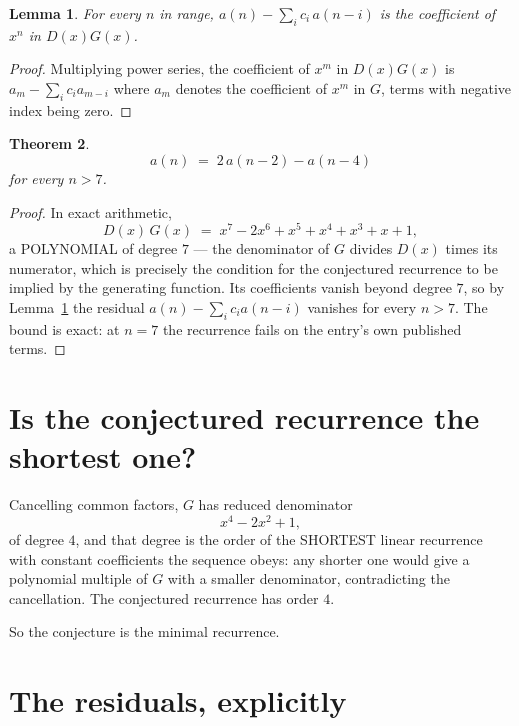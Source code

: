 \documentclass[11pt,a4paper]{article}
\theoremstyle{plain}
\newtheorem{theorem}{Theorem}
\newtheorem{lemma}[theorem]{Lemma}
\theoremstyle{definition}
\begin{document}
\begin{lemma}\label{lem:key}
For every $n$ in range, $a(n)-\sum_i c_i\,a(n-i)$ is the coefficient of $x^{n}$ in
$D(x)G(x)$.
\end{lemma}

\begin{proof}
Multiplying power series, the coefficient of $x^{m}$ in $D(x)G(x)$ is
$a_m-\sum_i c_i a_{m-i}$ where $a_m$ denotes the coefficient of $x^{m}$ in $G$, terms with
negative index being zero.
\end{proof}

\begin{theorem}
\[
a(n)\;=\;2\,a(n-2) - a(n-4)
\]
for every $n>7$.
\end{theorem}

\begin{proof}
In exact arithmetic,
\[
D(x)\,G(x)\;=\;x^{7} - 2 x^{6} + x^{5} + x^{4} + x^{3} + x + 1,
\]
a POLYNOMIAL of degree $7$ --- the denominator of $G$ divides $D(x)$ times its numerator,
which is precisely the condition for the conjectured recurrence to be implied by the
generating function. Its coefficients vanish beyond degree $7$, so by
Lemma~\ref{lem:key} the residual $a(n)-\sum_ic_ia(n-i)$ vanishes for every
$n>7$. The bound is exact: at $n=7$ the recurrence fails on the entry's own published terms.
\end{proof}

\section{Is the conjectured recurrence the shortest one?}

Cancelling common factors, $G$ has reduced denominator
\[
x^{4} - 2 x^{2} + 1,
\]
of degree $4$, and that degree is the order of the SHORTEST linear recurrence with
constant coefficients the sequence obeys: any shorter one would give a polynomial multiple of
$G$ with a smaller denominator, contradicting the cancellation. The conjectured recurrence has
order $4$.

So the conjecture is the minimal recurrence.

\section{The residuals, explicitly}
\end{document}
